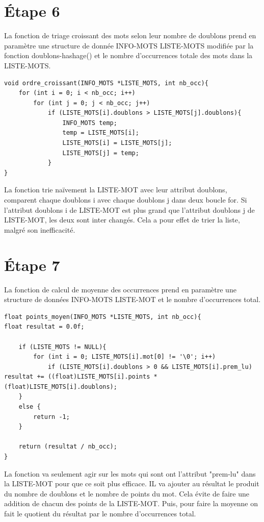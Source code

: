 \documentclass{article}
\begin{document}
\section*{Étape 6}
La fonction de triage croissant des mots selon leur nombre de doublons prend en paramètre une structure de donnée INFO-MOTS LISTE-MOTS modifiée par la fonction doublons-hashage() et le nombre d'occurrences totale des mots dans la LISTE-MOTS.\newline
\begin{lstlisting}[style=Cstyle]
void ordre_croissant(INFO_MOTS *LISTE_MOTS, int nb_occ){
    for (int i = 0; i < nb_occ; i++)
        for (int j = 0; j < nb_occ; j++)
            if (LISTE_MOTS[i].doublons > LISTE_MOTS[j].doublons){
                INFO_MOTS temp;
                temp = LISTE_MOTS[i];
                LISTE_MOTS[i] = LISTE_MOTS[j];
                LISTE_MOTS[j] = temp;
            }
}
\end{lstlisting}
La fonction trie naïvement la LISTE-MOT avec leur attribut doublons, comparent chaque doublons i avec chaque doublons j dans deux boucle for. Si l'attribut doublons i de LISTE-MOT est plus grand que l'attribut doublons j de LISTE-MOT, les deux sont inter changés. Cela a pour effet de trier la liste, malgré son inefficacité.

\section*{Étape 7}
La fonction de calcul de moyenne des occurrences prend en paramètre une structure de données INFO-MOTS LISTE-MOT et le nombre d'occurrences total.
\begin{lstlisting}[style=Cstyle]
float points_moyen(INFO_MOTS *LISTE_MOTS, int nb_occ){
float resultat = 0.0f;

    if (LISTE_MOTS != NULL){
        for (int i = 0; LISTE_MOTS[i].mot[0] != '\0'; i++)
            if (LISTE_MOTS[i].doublons > 0 && LISTE_MOTS[i].prem_lu) resultat += ((float)LISTE_MOTS[i].points * (float)LISTE_MOTS[i].doublons);
    }
    else {
        return -1;
    }

    return (resultat / nb_occ);
}
\end{lstlisting}
La fonction va seulement agir sur les mots qui sont ont l'attribut "prem-lu" dans la LISTE-MOT pour que ce soit plus efficace. IL va ajouter au résultat le produit du nombre de doublons et le nombre de points du mot. Cela évite de faire une addition de chacun des points de la LISTE-MOT. Puis, pour faire la moyenne on fait le quotient du résultat par le nombre d'occurrences total.\newline\newline
\end{document}
